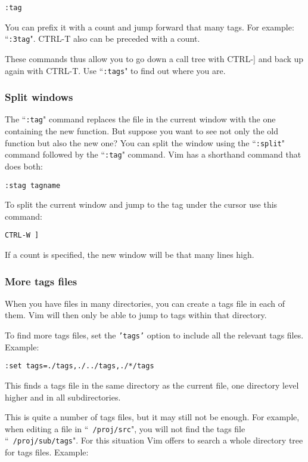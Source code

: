 \begin{Verbatim}[samepage=true]
 :tag
\end{Verbatim}

You can prefix it with a count and jump forward that many tags.
For example: ``\texttt{:3tag}".
CTRL-T also can be preceded with a count.

These commands thus allow you to go down a call tree with CTRL-] and back up again with CTRL-T.
Use ``\texttt{:tags}" to find out where you are.
\subsubsection{Split windows}
The ``\texttt{:tag}" command replaces the file in the current window with the one containing the new function.
But suppose you want to see not only the old function but also the new one?  You can split the window using the ``\texttt{:split}" command followed by the ``\texttt{:tag}" command.
Vim has a shorthand command that does both:

\begin{Verbatim}[samepage=true]
 :stag tagname
\end{Verbatim}

To split the current window and jump to the tag under the cursor use this command:

\begin{Verbatim}[samepage=true]
 CTRL-W ]
\end{Verbatim}

If a count is specified, the new window will be that many lines high.
\subsubsection{More tags files}
When you have files in many directories, you can create a tags file in each of them.
Vim will then only be able to jump to tags within that directory.

To find more tags files, set the \texttt{'tags'} option to include all the relevant tags files.
Example:

\begin{Verbatim}[samepage=true]
 :set tags=./tags,./../tags,./*/tags
\end{Verbatim}

This finds a tags file in the same directory as the current file, one directory level higher and in all subdirectories.

This is quite a number of tags files, but it may still not be enough.
For example, when editing a file in ``\texttt{~/proj/src}", you will not find the tags file ``\texttt{~/proj/sub/tags}".
For this situation Vim offers to search a whole directory tree for tags files.
Example:

